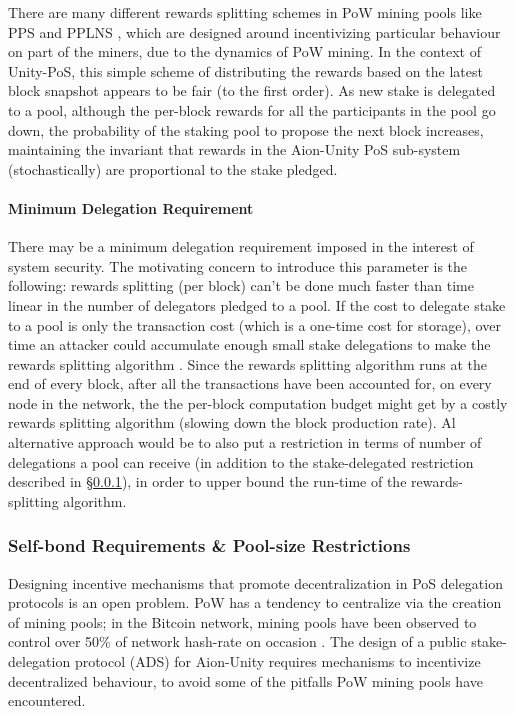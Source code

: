 There are many different rewards splitting schemes in PoW mining pools like PPS and PPLNS \cite{Coi18}, which are designed around incentivizing particular behaviour on part of the miners, due to the dynamics of PoW mining. In the context of Unity-PoS, this simple scheme of distributing the rewards based on the latest block snapshot appears to be fair (to the first order). As new stake is delegated to a pool, although the per-block rewards for all the participants in the pool go down, the probability of the staking pool  to propose the next block increases, maintaining the invariant that rewards in the Aion-Unity PoS sub-system (stochastically) are proportional to the stake pledged. 

\paragraph{Minimum Delegation Requirement} \label{min_delegation}
There may be a minimum delegation requirement imposed in the interest of system security. The motivating concern to introduce this parameter is the following: rewards splitting (per block) can't be done much faster than time linear in the number of delegators pledged to a pool. If the cost to delegate stake to a pool is only the transaction cost (which is a one-time cost for storage), over time an attacker could accumulate enough small stake delegations to make the rewards splitting algorithm . Since the rewards splitting algorithm runs at the end of every block, after all the transactions have been accounted for, on every node in the network, the the per-block computation budget might get  by a costly rewards splitting algorithm (slowing down the block production rate). Al alternative approach would be to also put a restriction in terms of number of delegations a pool can receive (in addition to the stake-delegated restriction described in \S\ref{self_bond}), in order to upper bound the run-time of the rewards-splitting algorithm. 

\subsubsection{Self-bond Requirements \& Pool-size Restrictions} \label{self_bond}

Designing incentive mechanisms that promote decentralization in PoS delegation protocols is an open problem. PoW has a tendency to centralize via the creation of mining pools; in the Bitcoin network, mining pools have been observed to control over 50\% of network hash-rate on occasion \cite{RJZ+19}. The design of a public stake-delegation protocol (ADS) for Aion-Unity requires mechanisms to incentivize decentralized behaviour, to avoid some of the pitfalls PoW mining pools have encountered. 

